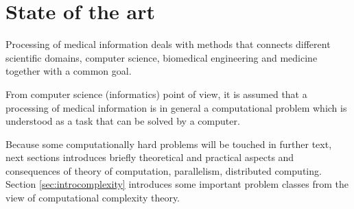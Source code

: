 \chapter{State of the art}
\label{sec:stateoftheart}


Processing of medical information deals with methods that connects different scientific domains, computer science, biomedical engineering and medicine together with a common goal. 



From computer science (informatics) point of view, it is assumed that a processing of medical information is in general a computational problem which is understood as a task that can be solved by a computer. 

Because some computationally hard problems will be touched in further text, next sections introduces briefly theoretical and practical aspects and consequences of theory of computation, parallelism, distributed computing. Section \ref{sec:introcomplexity} introduces some important problem classes from the view of computational complexity theory. 

